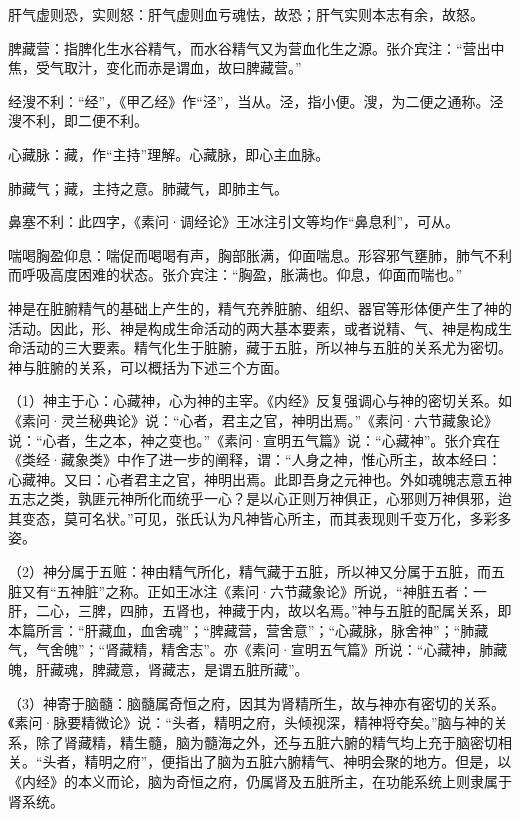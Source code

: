 \documentclass[12pt]{ctexbook}
\begin{document}
\begin{jiaozhu}
  \item 肝气虚则恐，实则怒：肝气虚则血亏魂怯，故恐；肝气实则本志有余，故怒。
  \item 脾藏营：指脾化生水谷精气，而水谷精气又为营血化生之源。张介宾注：“营出中焦，受气取汁，变化而赤是谓血，故曰脾藏营。”
  \item 经溲不利：“经”，《甲乙经》作“泾”，当从。泾，指小便。溲，为二便之通称。泾溲不利，即二便不利。
  \item 心藏脉：藏，作“主持”理解。心藏脉，即心主血脉。
  \item 肺藏气；藏，主持之意。肺藏气，即肺主气。
  \item 鼻塞不利：此四字，《素问·调经论》王冰注引文等均作“鼻息利”，可从。
  \item 喘喝胸盈仰息：喘促而喝喝有声，胸部胀满，仰面喘息。形容邪气壅肺，肺气不利而呼吸高度困难的状态。张介宾注：“胸盈，胀满也。仰息，仰面而喘也。”
\end{jiaozhu}



神是在脏腑精气的基础上产生的，精气充养脏腑、组织、器官等形体便产生了神的活动。因此，形、神是构成生命活动的两大基本要素，或者说精、气、神是构成生命活动的三大要素。精气化生于脏腑，藏于五脏，所以神与五脏的关系尤为密切。神与脏腑的关系，可以概括为下述三个方面。

（1）神主于心：心藏神，心为神的主宰。《内经》反复强调心与神的密切关系。如《素问·灵兰秘典论》说：“心者，君主之官，神明出焉。”《素问·六节藏象论》说：“心者，生之本，神之变也。”《素问·宣明五气篇》说：“心藏神”。张介宾在《类经·藏象类》中作了进一步的阐释，谓：“人身之神，惟心所主，故本经曰：心藏神。又曰：心者君主之官，神明出焉。此即吾身之元神也。外如魂魄志意五神五志之类，孰匪元神所化而统乎一心？是以心正则万神俱正，心邪则万神俱邪，迨其变态，莫可名状。”可见，张氏认为凡神皆心所主，而其表现则千变万化，多彩多姿。

（2）神分属于五赃：神由精气所化，精气藏于五脏，所以神又分属于五脏，而五脏又有“五神脏”之称。正如王冰注《素问·六节藏象论》所说，“神脏五者：一肝，二心，三脾，四肺，五肾也，神藏于内，故以名焉。”神与五脏的配属关系，即本篇所言：“肝藏血，血舍魂”；“脾藏营，营舍意”；“心藏脉，脉舍神”；“肺藏气，气舍魄”；“肾藏精，精舍志”。亦《素问·宣明五气篇》所说：“心藏神，肺藏魄，肝藏魂，脾藏意，肾藏志，是谓五脏所藏”。

（3）神寄于脑髓：脑髓属奇恒之府，因其为肾精所生，故与神亦有密切的关系。《素问·脉要精微论》说：“头者，精明之府，头倾视深，精神将夺矣。”脑与神的关系，除了肾藏精，精生髓，脑为髓海之外，还与五脏六腑的精气均上充于脑密切相关。“头者，精明之府”，便指出了脑为五脏六腑精气、神明会聚的地方。但是，以《内经》的本义而论，脑为奇恒之府，仍属肾及五脏所主，在功能系统上则隶属于肾系统。
\end{document}
